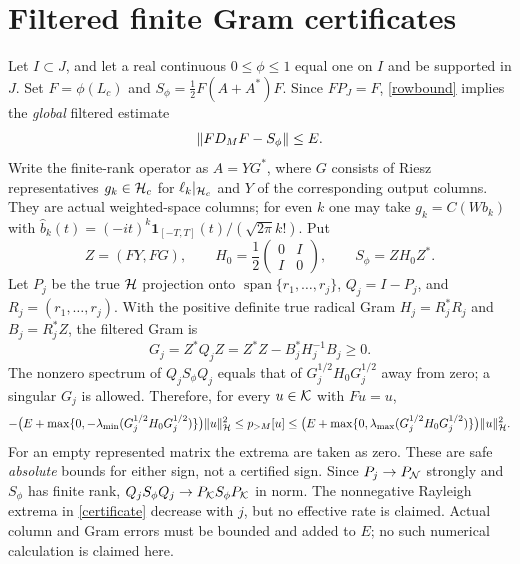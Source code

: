 \documentclass[11pt]{article}
\begin{document}
\section{Filtered finite Gram certificates}\label{sec:gram}
Let $I\subset J$, and let a real continuous $0\le\phi\le1$ equal one on $I$ and be supported in $J$. Set $F=\phi(L_c)$ and $S_\phi=\frac12F(A+A^*)F$. Since $FP_J=F$, \eqref{rowbound} implies the \emph{global} filtered estimate
\begin{equation}\label{filtererror}
 \lVert F D_M F-S_\phi\rVert\le E.
\end{equation}
Write the finite-rank operator as $A=YG^*$, where $G$ consists of Riesz representatives $g_k\in\mathcal H_c$ for $\ell_k|_{\mathcal H_c}$ and $Y$ of the corresponding output columns. They are actual weighted-space columns; for even $k$ one may take $g_k=C(Wb_k)$ with $\widehat b_k(t)=(-it)^k\mathbf1_{[-T,T]}(t)/(\sqrt{2\pi}k!)$. Put
\[Z=(FY,FG),\qquad H_0=\frac12\begin{pmatrix}0&I\\I&0\end{pmatrix},\qquad S_\phi=ZH_0Z^*.\]
Let $P_j$ be the true $\mathcal H$ projection onto $\operatorname{span}\{r_1,\ldots,r_j\}$, $Q_j=I-P_j$, and $R_j=(r_1,\ldots,r_j)$. With the positive definite true radical Gram $H_j=R_j^*R_j$ and $B_j=R_j^*Z$, the filtered Gram is
\begin{equation}\label{gram}
 G_j=Z^*Q_jZ=Z^*Z-B_j^*H_j^{-1}B_j\ge0.
\end{equation}
The nonzero spectrum of $Q_jS_\phi Q_j$ equals that of $G_j^{1/2}H_0G_j^{1/2}$ away from zero; a singular $G_j$ is allowed. Therefore, for every $u\in\mathcal K$ with $Fu=u$,
\begin{equation}\label{certificate}
 -\bigl(E+\max\{0,-\lambda_{\min}(G_j^{1/2}H_0G_j^{1/2})\}\bigr)\lVert u\rVert_{\mathcal H}^2
 \le p_{>M}[u]
 \le\bigl(E+\max\{0,\lambda_{\max}(G_j^{1/2}H_0G_j^{1/2})\}\bigr)\lVert u\rVert_{\mathcal H}^2.
\end{equation}
For an empty represented matrix the extrema are taken as zero. These are safe \emph{absolute} bounds for either sign, not a certified sign. Since $P_j\to P_\mathcal N$ strongly and $S_\phi$ has finite rank, $Q_jS_\phi Q_j\to P_\mathcal K S_\phi P_\mathcal K$ in norm. The nonnegative Rayleigh extrema in \eqref{certificate} decrease with $j$, but no effective rate is claimed. Actual column and Gram errors must be bounded and added to $E$; no such numerical calculation is claimed here.
\end{document}
